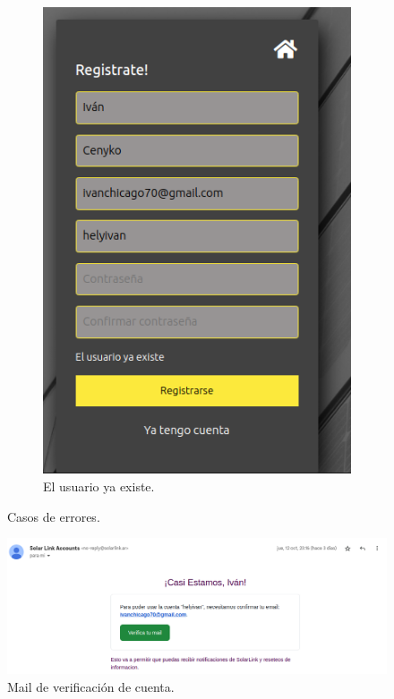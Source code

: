 \begin{itemize}
\begin{figure}[H]
\begin{subfigure}{0.5\textwidth}
\includegraphics[width=0.9\linewidth]{web/Captura desde 2023-10-15 23-23-28.png}
\caption{El usuario ya existe.}
\label{fig:subim2}
\end{subfigure}

\caption{Casos de errores.}
\label{fig:image2}
\end{figure}

\begin{figure}[H]
    \centering
    \includegraphics[width=1\linewidth]{web/Captura desde 2023-10-15 23-27-44.png}
    \caption{Mail de verificación de cuenta.}
    \label{fig:mail-verify}
\end{figure}


\end{itemize}
